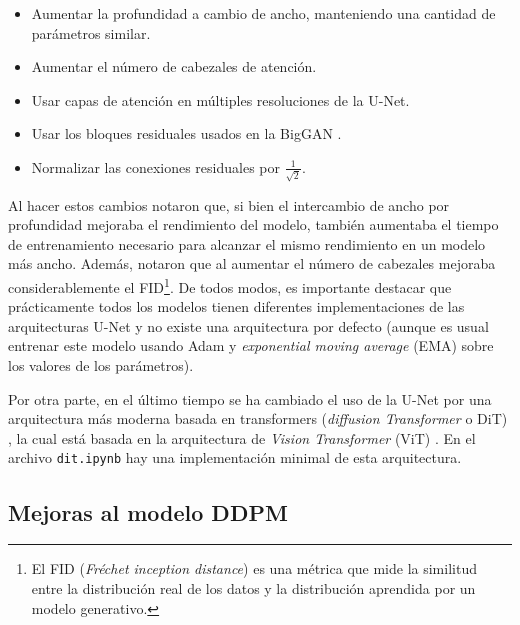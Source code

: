 \begin{itemize}
	\item Aumentar la profundidad a cambio de ancho, manteniendo una cantidad de parámetros similar.
	\item Aumentar el número de cabezales de atención.
	\item Usar capas de atención en múltiples resoluciones de la U-Net.
	\item Usar los bloques residuales usados en la BigGAN \cite{brock2019largescalegantraining}.
	\item Normalizar las conexiones residuales por $\frac{1}{\sqrt{2}}$.
\end{itemize}


Al hacer estos cambios notaron que, si bien el intercambio de ancho por profundidad mejoraba el rendimiento del modelo, también aumentaba el tiempo de entrenamiento necesario para alcanzar el mismo rendimiento en un modelo más ancho. Además, notaron que al aumentar el número de cabezales mejoraba considerablemente el FID\footnote{El FID (\textit{Fréchet inception distance}) es una métrica que mide la similitud entre la distribución real de los datos y la distribución aprendida por un modelo generativo.}. De todos modos, es importante destacar que prácticamente todos los modelos tienen diferentes implementaciones de las arquitecturas U-Net y no existe una arquitectura por defecto (aunque es usual entrenar este modelo usando Adam y \textit{exponential moving average} (EMA) sobre los valores de los parámetros).

Por otra parte, en el último tiempo se ha cambiado el uso de la U-Net por una arquitectura más moderna basada en transformers (\textit{diffusion Transformer} o DiT) \cite{peebles2023scalablediffusionmodelstransformers}, la cual está basada en la arquitectura de \textit{Vision Transformer} (ViT) \cite{dosovitskiy2021image}. En el archivo \texttt{dit.ipynb} hay una implementación minimal de esta arquitectura.

\subsection{Mejoras al modelo DDPM}
\label{dm/discrete_dm/improvements}

